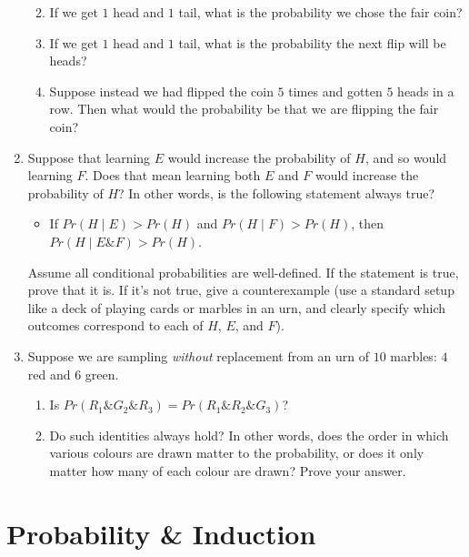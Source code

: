 \documentclass[justified]{tufte-book}
\providecommand{\tightlist}{%
  \setlength{\itemsep}{0pt}\setlength{\parskip}{0pt}}
\newcommand{\given}{\mid}
\renewcommand{\wedge}{\mathbin{\&}}
\newcommand{\p}{Pr}
\theoremstyle{definition}
\theoremstyle{definition}
\theoremstyle{definition}
\theoremstyle{definition}
\theoremstyle{remark}
\begin{document}
\begin{enumerate}
  \begin{enumerate}
  \def\labelenumii{\alph{enumii}.}
  \tightlist
  \item
    If we get \(1\) head and \(1\) tail, what is the probability we chose the fair coin?
  \item
    If we get \(1\) head and \(1\) tail, what is the probability the next flip will be heads?
  \item
    Suppose instead we had flipped the coin \(5\) times and gotten \(5\) heads in a row. Then what would the probability be that we are flipping the fair coin?
  \end{enumerate}
\item
  Suppose that learning \(E\) would increase the probability of \(H\), and so would learning \(F\). Does that mean learning both \(E\) and \(F\) would increase the probability of \(H\)? In other words, is the following statement always true?

  \begin{itemize}
  \tightlist
  \item
    If \(\p(H \given E) > \p(H)\) and \(\p(H \given F) > \p(H)\), then \(\p(H \given E \wedge F) > \p(H)\).
  \end{itemize}

  Assume all conditional probabilities are well-defined. If the statement is true, prove that it is. If it's not true, give a counterexample (use a standard setup like a deck of playing cards or marbles in an urn, and clearly specify which outcomes correspond to each of \(H\), \(E\), and \(F\)).
\item
  Suppose we are sampling \emph{without} replacement from an urn of \(10\) marbles: \(4\) red and \(6\) green.

  \begin{enumerate}
  \def\labelenumii{\alph{enumii}.}
  \tightlist
  \item
    Is \(\p(R_1 \wedge G_2 \wedge R_3) = \p(R_1 \wedge R_2 \wedge G_3)\)?
  \item
    Do such identities always hold? In other words, does the order in which various colours are drawn matter to the probability, or does it only matter how many of each colour are drawn? Prove your answer.
  \end{enumerate}
\end{enumerate}

\hypertarget{probability-induction}{%
\chapter{Probability \& Induction}\label{probability-induction}}
\end{document}
